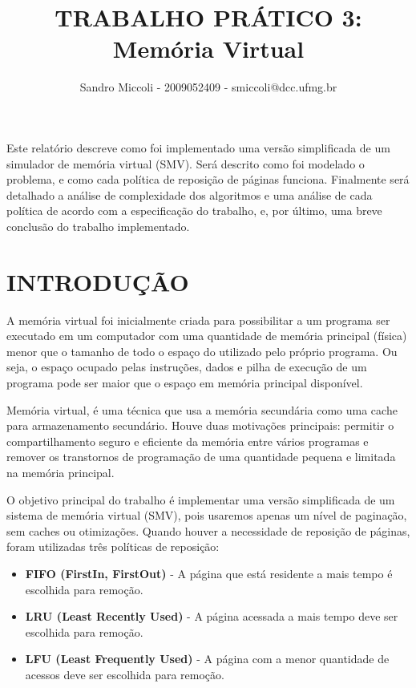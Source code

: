 \documentclass[12pt]{article}
\title{TRABALHO PRÁTICO 3: \\ Memória Virtual}
\author{Sandro Miccoli - 2009052409 - smiccoli@dcc.ufmg.br}
\begin{document}
\maketitle

\begin{resumo}
Este relatório descreve como foi implementado uma versão simplificada de um simulador de memória virtual (SMV). Será descrito como foi modelado o problema, e como cada política de reposição de páginas funciona. Finalmente será detalhado a análise de complexidade dos algoritmos e uma análise de cada política de acordo com a especificação do trabalho, e, por último, uma breve conclusão do trabalho implementado.
\end{resumo}

\section{INTRODUÇÃO}

    A memória virtual foi inicialmente criada para possibilitar a um programa ser executado em um computador com uma quantidade de memória principal (física) menor que o tamanho de todo o espaço do utilizado pelo próprio programa. Ou seja, o espaço ocupado pelas instruções, dados e pilha de execução de um programa pode ser maior que o espaço em memória principal disponível.

    Memória virtual, é uma técnica que usa a memória secundária como uma cache para armazenamento secundário. Houve duas motivações principais: permitir o compartilhamento seguro e eficiente da memória entre vários programas e remover os transtornos de programação de uma quantidade pequena e limitada na memória principal. \cite{wikimv}

    O objetivo principal do trabalho é implementar uma versão simplificada de um sistema de memória virtual (SMV), pois usaremos apenas um nível de paginação, sem caches ou otimizações. Quando houver a necessidade de reposição de páginas, foram utilizadas três políticas de reposição:

    \begin{itemize}
    \item \textbf{FIFO (FirstIn, FirstOut)} - A página que está residente a mais tempo é escolhida para remoção.
    \item \textbf{LRU (Least Recently Used)} - A página acessada a mais tempo deve ser escolhida para remoção.
    \item \textbf{LFU (Least Frequently Used)} - A página com a menor quantidade de acessos deve ser escolhida para remoção.
    \end{itemize}
\end{document}
